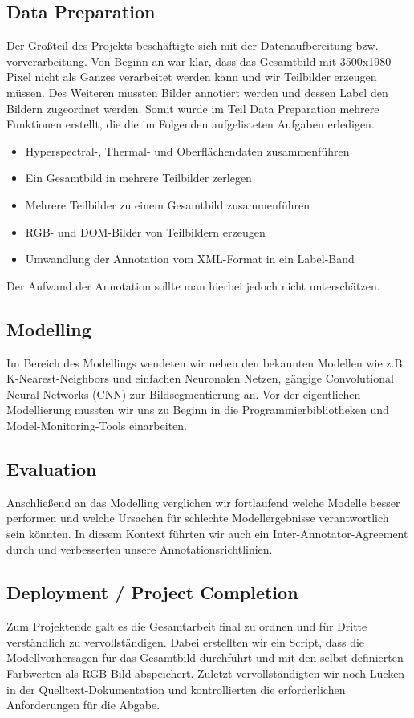 \subsection{Data Preparation}
Der Großteil des Projekts beschäftigte sich mit der Datenaufbereitung bzw. -vorverarbeitung.
Von Beginn an war klar, dass das Gesamtbild mit 3500x1980 Pixel nicht als Ganzes verarbeitet werden kann und wir Teilbilder erzeugen müssen.
Des Weiteren mussten Bilder annotiert werden und dessen Label den Bildern zugeordnet werden.
Somit wurde im Teil Data Preparation mehrere Funktionen erstellt, die die im Folgenden aufgelisteten Aufgaben erledigen.

\begin{itemize}
    \item Hyperspectral-, Thermal- und Oberflächendaten zusammenführen
    \item Ein Gesamtbild in mehrere Teilbilder zerlegen
    \item Mehrere Teilbilder zu einem Gesamtbild zusammenführen
    \item RGB- und DOM-Bilder von Teilbildern erzeugen
    \item Umwandlung der Annotation vom XML-Format in ein Label-Band
\end{itemize}

Der Aufwand der Annotation sollte man hierbei jedoch nicht unterschätzen.

\subsection{Modelling}
Im Bereich des Modellings wendeten wir neben den bekannten Modellen wie z.B. K-Nearest-Neighbors und
einfachen Neuronalen Netzen, gängige Convolutional Neural Networks (CNN) zur Bildsegmentierung an.
Vor der eigentlichen Modellierung mussten wir uns zu Beginn in die Programmierbibliotheken und Model-Monitoring-Tools
einarbeiten.

\subsection{Evaluation}
Anschließend an das Modelling verglichen wir fortlaufend welche Modelle besser performen und welche Ursachen für
schlechte Modellergebnisse verantwortlich sein könnten.
In diesem Kontext führten wir auch ein Inter-Annotator-Agreement durch und verbesserten unsere Annotationsrichtlinien.

\subsection{Deployment / Project Completion}
Zum Projektende galt es die Gesamtarbeit final zu ordnen und für Dritte verständlich zu vervollständigen.
Dabei erstellten wir ein Script, dass die Modellvorhersagen für das Gesamtbild durchführt und mit den selbst
definierten Farbwerten als RGB-Bild abspeichert.
Zuletzt vervollständigten wir noch Lücken in der Quelltext-Dokumentation und kontrollierten die erforderlichen
Anforderungen für die Abgabe.


